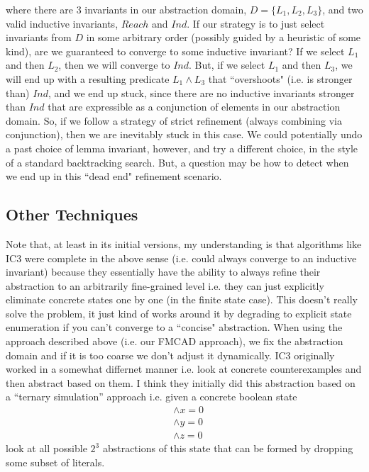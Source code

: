 \documentclass[10pt]{article}
\begin{document}
where there are 3 invariants in our abstraction domain, $D=\{L_1, L_2, L_3\}$, and two valid inductive invariants, $Reach$ and $Ind$. If our strategy is to just select invariants from $D$ in some arbitrary order (possibly guided by a heuristic of some kind), are we guaranteed to converge to some inductive invariant? If we select $L_1$ and then $L_2$, then we will converge to $Ind$. But, if we select $L_1$ and then $L_3$, we will end up with a resulting predicate $L_1 \wedge L_3$ that ``overshoots" (i.e. is stronger than) $Ind$, and we end up stuck, since there are no inductive invariants stronger than $Ind$ that are expressible as a conjunction of elements in our abstraction domain. So, if we follow a strategy of strict refinement (always combining via conjunction), then we are inevitably stuck in this case. We could potentially undo a past choice of lemma invariant, however, and try a different choice, in the style of a standard backtracking search. But, a question may be how to detect when we end up in this ``dead end" refinement scenario.

\subsection*{Other Techniques}

Note that, at least in its initial versions, my understanding is that algorithms like IC3 were complete in the above sense (i.e. could always converge to an inductive invariant) because they essentially have the ability to always refine their abstraction to an arbitrarily fine-grained level i.e. they can just explicitly eliminate concrete states one by one (in the finite state case). This doesn't really solve the problem, it just kind of works around it by degrading to explicit state enumeration if you can't converge to a ``concise" abstraction. When using the approach described above (i.e. our FMCAD approach), we fix the abstraction domain and if it is too coarse we don't adjust it dynamically. IC3 originally worked in a somewhat differnet manner i.e. look at concrete counterexamples and then abstract based on them. I think they initially did this abstraction based on a ``ternary simulation'' approach i.e. given a concrete boolean state 
\begin{align*}
    &\wedge x = 0 \\ 
    &\wedge y = 0 \\ 
    &\wedge z = 0
\end{align*}
look at all possible $2^3$ abstractions of this state that can be formed by dropping some subset of literals.
\end{document}
